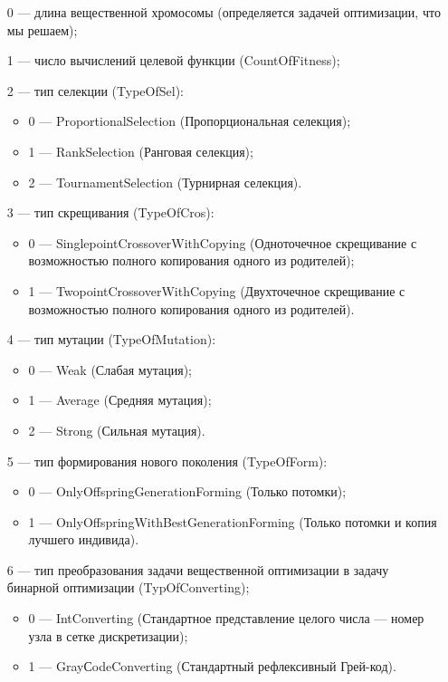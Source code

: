 \documentclass[a4paper,12pt]{article}
\begin{document}
 \begin{itemize}
 \item   [0] --- длина вещественной хромосомы (определяется задачей оптимизации, что мы решаем);
  \item   [1] --- число вычислений целевой функции (CountOfFitness);
  \item    [2] --- тип селекции (TypeOfSel):
 \begin{itemize}
       \item 0 --- ProportionalSelection (Пропорциональная селекция);
 
       \item 1 --- RankSelection (Ранговая селекция);
 
       \item 2 --- TournamentSelection (Турнирная селекция).
	    \end{itemize}
 
 \item [3] --- тип скрещивания (TypeOfCros):
  \begin{itemize}
       \item 0 --- SinglepointCrossoverWithCopying (Одноточечное скрещивание с возможностью полного копирования одного из родителей);
 
       \item 1 --- TwopointCrossoverWithCopying (Двухточечное скрещивание с возможностью полного копирования одного из родителей).
	    \end{itemize}
 
 \item [4] --- тип мутации (TypeOfMutation):
  \begin{itemize}
       \item 0 --- Weak (Слабая мутация);
 
       \item 1 --- Average (Средняя мутация);
 
       \item 2 --- Strong (Сильная мутация).
	    \end{itemize}
 
 \item [5] --- тип формирования нового поколения (TypeOfForm):
  \begin{itemize}
       \item 0 --- OnlyOffspringGenerationForming (Только потомки);
 
       \item 1 --- OnlyOffspringWithBestGenerationForming (Только потомки и копия лучшего индивида).
	    \end{itemize}
 \item [6] --- тип преобразования задачи вещественной оптимизации в задачу бинарной оптимизации (TypOfConverting);
   \begin{itemize}
        \item 0 --- IntConverting (Стандартное представление целого числа –-- номер узла в сетке дискретизации);
        \item 1 --- GrayСodeConverting (Стандартный рефлексивный Грей-код).
			    \end{itemize}
 \end{itemize}
 
\end{document}
